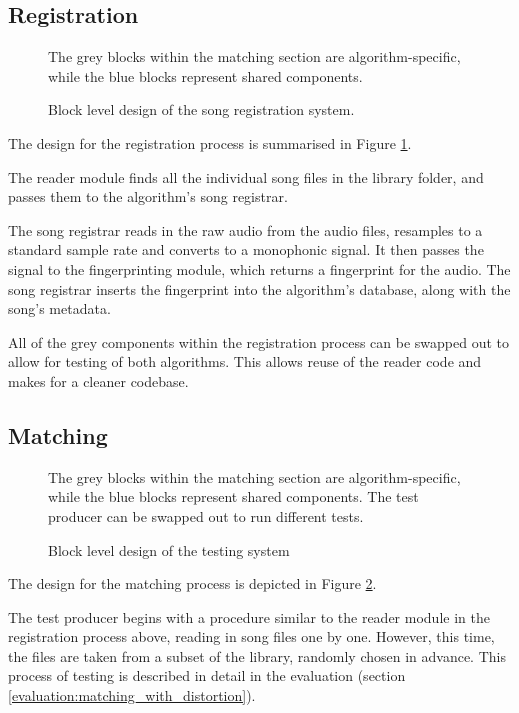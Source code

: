 \documentclass[12pt,a4paper,twoside,openright]{report}
\begin{document}
\subsection{Registration}

\begin{figure}[htb]
  \centering
  
  \caption{Block level design of the song registration system.}
  \label{figs:registration_design}
  \medskip \small
  The grey blocks within the matching section are algorithm-specific, while the blue blocks represent shared components.
\end{figure}

The design for the registration process is summarised in Figure \ref{figs:registration_design}. 

The reader module finds all the individual song files in the library folder, and passes them to the algorithm's song registrar.

The song registrar reads in the raw audio from the audio files, resamples to a standard sample rate and converts to a monophonic signal. It then passes the signal to the fingerprinting module, which returns a fingerprint for the audio. The song registrar inserts the fingerprint into the algorithm's database, along with the song's metadata.

All of the grey components within the registration process can be swapped out to allow for testing of both algorithms. This allows reuse of the reader code and makes for a cleaner codebase.


\subsection{Matching}

\begin{figure}[htb]
  \centering
  
  \caption{Block level design of the testing system}
  \label{figs:matching_design}
  \medskip \small
  The grey blocks within the matching section are algorithm-specific, while the blue blocks represent shared components. The test producer can be swapped out to run different tests.
\end{figure}

The design for the matching process is depicted in Figure \ref{figs:matching_design}.

The test producer begins with a procedure similar to the reader module in the registration process above, reading in song files one by one. However, this time, the files are taken from a subset of the library, randomly chosen in advance. This process of testing is described in detail in the evaluation (section \ref{evaluation:matching_with_distortion}).
\end{document}
